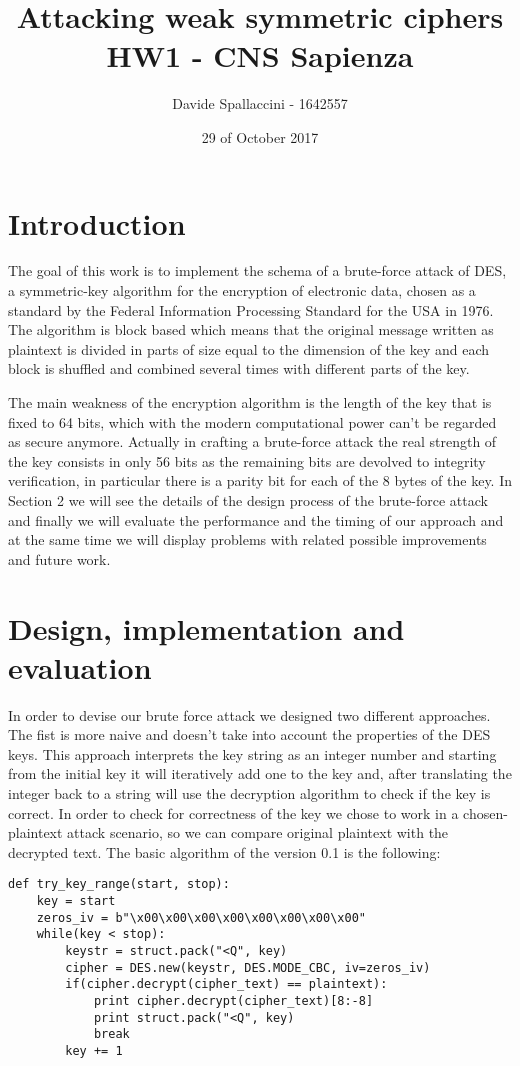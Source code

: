 \documentclass[11pt]{article}
\begin{document}
\title{Attacking weak symmetric ciphers\\ HW1 - CNS Sapienza}
\author{Davide Spallaccini - 1642557}
\date{29 of October 2017}
\maketitle


\section{Introduction}
The goal of this work is to implement the schema of a brute-force attack of DES, a symmetric-key algorithm for the encryption of electronic data, chosen as a standard by the Federal Information Processing Standard for the USA in 1976. The algorithm is block based which means that the original message written as plaintext is divided in parts of size equal to the dimension of the key and each block is shuffled and combined several times with different parts of the key.

The main weakness of the encryption algorithm is the length of the key that is fixed to 64 bits, which with the modern computational power can't be regarded as secure anymore. Actually in crafting a brute-force attack the real strength of the key consists in only 56 bits as the remaining bits are devolved to integrity verification, in particular there is a parity bit for each of the 8 bytes of the key.
In Section 2 we will see the details of the design process of the brute-force attack and finally we will evaluate the performance and the timing of our approach and at the same time we will display problems with related possible improvements and future work.

\section{Design, implementation and evaluation}
In order to devise our brute force attack we designed two different approaches. The fist is more naive and doesn't take into account the properties of the DES keys. This approach interprets the key string as an integer number and starting from the initial key it will iteratively add one to the key and, after translating the integer back to a string will use the decryption algorithm to check if the key is correct. In order to check for correctness of the key we chose to work in a chosen-plaintext attack scenario, so we can compare original plaintext with the decrypted text. The basic algorithm of the version 0.1 is the following:
\begin{verbatim}
def try_key_range(start, stop):
    key = start
    zeros_iv = b"\x00\x00\x00\x00\x00\x00\x00\x00"
    while(key < stop):
        keystr = struct.pack("<Q", key)
        cipher = DES.new(keystr, DES.MODE_CBC, iv=zeros_iv)
        if(cipher.decrypt(cipher_text) == plaintext):
            print cipher.decrypt(cipher_text)[8:-8]
            print struct.pack("<Q", key)
	        break
	    key += 1
\end{verbatim}
\end{document}
